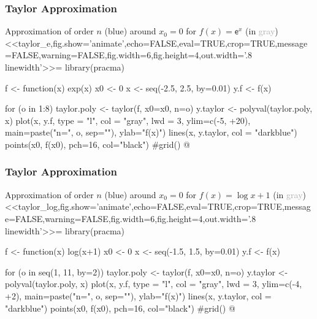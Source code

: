 \documentclass[%
  final,
  11pt, 
  show notes, %
  t, %
  fleqn, %
]{beamer}
\begin{document}
\begin{frame}[fragile]
  \frametitle{Taylor Approximation}
Approximation of order $n$ (\textcolor{CustomBlue}{blue}) around $x_0 = 0$ for $f(x) = \mathsf{e}^x$ (in \textcolor{darkgray}{gray})
<<taylor_e,fig.show='animate',echo=FALSE,eval=TRUE,crop=TRUE,message=FALSE,warning=FALSE,fig.width=6,fig.height=4,out.width='.8\\linewidth'>>=
library(pracma)

f <- function(x) exp(x)
x0 <- 0
x <- seq(-2.5, 2.5, by=0.01)
y.f <- f(x)

for (o in 1:8) {
  taylor.poly <- taylor(f, x0=x0, n=o)
  y.taylor <- polyval(taylor.poly, x)
  plot(x, y.f, type = "l", col = "gray", lwd = 3, ylim=c(-5, +20), main=paste("n=", o, sep=""), ylab="f(x)")
  lines(x, y.taylor, col = "darkblue")
	points(x0, f(x0), pch=16, col="black")
  #grid()
}
@
\end{frame}

\begin{frame}[fragile]
  \frametitle{Taylor Approximation}
Approximation of order $n$ (\textcolor{CustomBlue}{blue}) around $x_0 = 0$ for $f(x) = \log{x+1}$ (in \textcolor{darkgray}{gray})
<<taylor_log,fig.show='animate',echo=FALSE,eval=TRUE,crop=TRUE,message=FALSE,warning=FALSE,fig.width=6,fig.height=4,out.width='.8\\linewidth'>>=
library(pracma)

f <- function(x) log(x+1)
x0 <- 0
x <- seq(-1.5, 1.5, by=0.01)
y.f <- f(x)

for (o in seq(1, 11, by=2)) {
  taylor.poly <- taylor(f, x0=x0, n=o)
  y.taylor <- polyval(taylor.poly, x)
  plot(x, y.f, type = "l", col = "gray", lwd = 3, ylim=c(-4, +2), main=paste("n=", o, sep=""), ylab="f(x)")
  lines(x, y.taylor, col = "darkblue")
	points(x0, f(x0), pch=16, col="black")
  #grid()
}
@
\end{frame}
\end{document}
